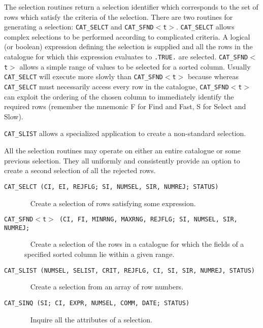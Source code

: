 The selection routines return a selection identifier which corresponds
to the set of rows which satisfy the criteria of the selection. There
are two routines for generating a selection: {\tt CAT\_SELCT} and
{\tt CAT\_SFND$<$t$>$}. {\tt CAT\_SELCT} allows complex selections to be
performed according to complicated criteria. A logical (or boolean)
expression defining the selection is supplied and all the rows in the
catalogue for which this expression evaluates to {\tt .TRUE.} are
selected. {\tt CAT\_SFND$<$t$>$} allows a simple range of values to be
selected for a sorted column. Usually {\tt CAT\_SELCT} will execute
more slowly than {\tt CAT\_SFND$<$t$>$} because whereas {\tt
CAT\_SELCT} must necessarily access every row in the catalogue, 
{\tt CAT\_SFND$<$t$>$} can exploit the ordering of the chosen column to
immediately identify the required rows (remember the mnemonic F for 
Find and Fast, S for Select and Slow).

{\tt CAT\_SLIST} allows a specialized application to create a non-standard
selection.

All the selection routines may operate on either an entire catalogue
or some previous selection. They all uniformly and consistently 
provide an option to create a second selection of all the rejected rows.

\begin{description}

  \item[ {\tt CAT\_SELCT (CI, EI, REJFLG; SI, NUMSEL, SIR, NUMREJ; 
   STATUS) } ] ~
  \newline Create a selection of rows satisfying some expression.

  \item[ {\tt CAT\_SFND$<$t$>$ (CI, FI, MINRNG, MAXRNG, REJFLG; SI, 
   NUMSEL, SIR, NUMREJ; } ] ~
  \newline Create a selection of the rows in a catalogue for which the
   fields of a specified sorted column lie within a given range.

  \item[ {\tt CAT\_SLIST (NUMSEL, SELIST, CRIT, REJFLG, CI, SI, SIR,
   NUMREJ, STATUS) } ] ~
  \newline Create a selection from an array of row numbers.

  \item[ {\tt CAT\_SINQ (SI; CI, EXPR, NUMSEL, COMM, DATE; STATUS) } ] ~
  \newline Inquire all the attributes of a selection.

\end{description}

